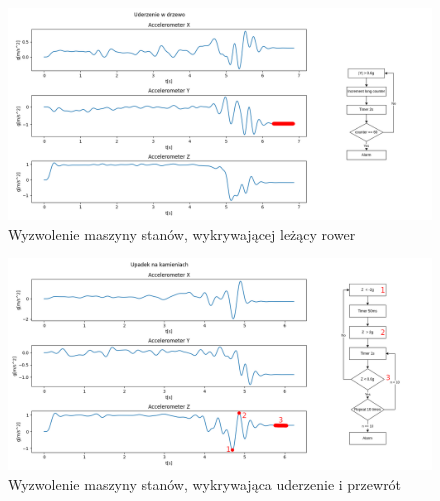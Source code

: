 \begin{figure}[h]
    \centering
    \includegraphics[width=15cm]{Graphics/Tree_title_to_fsm.png}
    \caption{Wyzwolenie maszyny stanów, wykrywającej leżący rower}
    \label{img:fsm3_recognize}
\end{figure}

\begin{figure}[h]
    \centering
    \includegraphics[width=15cm]{Graphics/Stones_title_to_fsm.png}
    \caption{Wyzwolenie maszyny stanów, wykrywająca uderzenie i przewrót}
    \label{img:fsm4_recognize}
\end{figure}